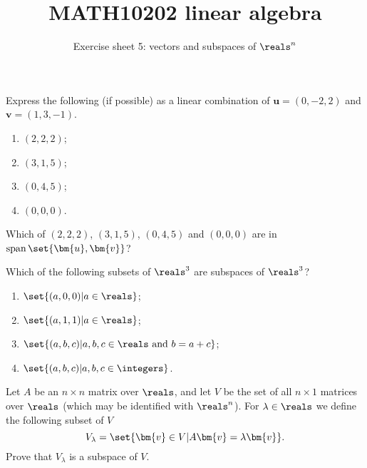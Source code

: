 \documentclass[english,12pt,a4paper]{scrartcl}
\title{MATH10202 linear algebra}
\subtitle{Exercise sheet 5: vectors and subspaces of $\reals^n$}
\author{}
\date{\vspace{-5ex}}
\renewcommand{\vec}[1]{\bm{#1}}
\newenvironment{modenumerate}
  {\enumerate\setupmodenumerate}
  {\endenumerate}
\newif\ifmoditem
\newcommand{\setupmodenumerate}{%
  \global\moditemfalse
  \let\origmakelabel\makelabel
  \def\moditem##1{\global\moditemtrue\def\mesymbol{##1}\item}%
  \def\makelabel##1{%
  \origmakelabel{##1\ifmoditem\rlap{\mesymbol}\fi\enspace}%
\global\moditemfalse}%
}
\DeclareMathOperator{\spn}{span}
\newcommand\spanset[1]{\ensuremath{\spn\set{#1}}}
\begin{document}
\maketitle

\begin{modenumerate}
  \moditem{*} Express the following (if possible) as a linear combination of 
  $\vec{u} = (0, -2, 2)$ and $\vec{v} = (1, 3, -1)$.
  \begin{multicols}{4}
    \begin{enumerate}
      \item $(2, 2, 2)$;
      \item $(3, 1, 5)$;
      \item $(0, 4, 5)$;
      \item $(0, 0, 0)$.
    \end{enumerate}
  \end{multicols}
  Which of $(2, 2, 2)$, $(3, 1, 5)$, $(0, 4, 5)$ and $(0, 0, 0)$ are in 
  $\spanset{\vec{u}, \vec{v}}$?
  \moditem{*} Which of the following subsets of $\reals^3$ are subspaces of 
  $\reals^3$?
  \begin{multicols}{2}
    \begin{enumerate}
      \item $\set{(a, 0, 0) | a \in \reals}$;
      \item $\set{(a, 1, 1) | a \in \reals}$;
      \item $\set{(a, b, c) | a, b, c \in \reals \text{ and } b = a + c}$;
      \item $\set{(a, b, c) | a, b, c \in \integers}$.
    \end{enumerate}
  \end{multicols}
  \moditem{*} Let $A$ be an $n \times n$ matrix over $\reals$, and let $V$ be 
  the set of all $n \times 1$ matrices over $\reals$ (which may be identified 
  with $\reals^n$). For $\lambda \in \reals$ we define the following subset of 
  $V$
  \[
    V_\lambda = \set{\vec{v} \in V | A\vec{v} = \lambda \vec{v}}.
  \]
  Prove that $V_\lambda$ is a subspace of $V$.
  

\end{modenumerate}
\end{document}
